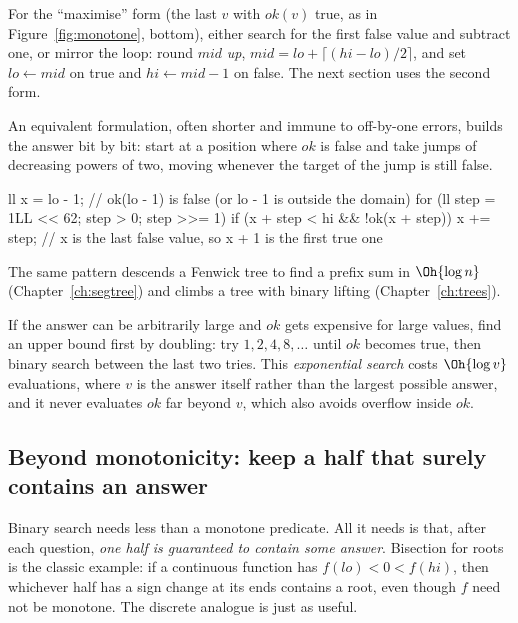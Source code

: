 For the ``maximise'' form (the last $v$ with $\mathit{ok}(v)$ true, as in Figure~\ref{fig:monotone}, bottom), either search
for the first false value and subtract one, or mirror the loop: round $mid$ \emph{up}, $mid = lo + \lceil (hi - lo)/2\rceil$,
and set $lo \gets mid$ on true and $hi \gets mid - 1$ on false. The next section uses the second form.


\begin{trick}
An equivalent formulation, often shorter and immune to off-by-one errors, builds the answer bit by bit: start at a position
where $\mathit{ok}$ is false and take jumps of decreasing powers of two, moving whenever the target of the jump is still
false.
\begin{code}
ll x = lo - 1;  // ok(lo - 1) is false (or lo - 1 is outside the domain)
for (ll step = 1LL << 62; step > 0; step >>= 1)
    if (x + step < hi && !ok(x + step)) x += step;
// x is the last false value, so x + 1 is the first true one
\end{code}
The same pattern descends a Fenwick tree to find a prefix sum in $\Oh{\log n}$ (Chapter~\ref{ch:segtree}) and climbs a tree
with binary lifting (Chapter~\ref{ch:trees}).
\end{trick}

\begin{trick}
If the answer can be arbitrarily large and $\mathit{ok}$ gets expensive for large values, find an upper bound first by
doubling: try $1, 2, 4, 8, \ldots$ until $\mathit{ok}$ becomes true, then binary search between the last two tries. This
\emph{exponential search} costs $\Oh{\log v}$ evaluations, where $v$ is the answer itself rather than the largest possible
answer, and it never evaluates $\mathit{ok}$ far beyond $v$, which also avoids overflow inside $\mathit{ok}$.
\end{trick}

\subsection{Beyond monotonicity: keep a half that surely contains an answer}

Binary search needs less than a monotone predicate. All it needs is that, after each question, \emph{one half is guaranteed
to contain some answer}. Bisection for roots is the classic example: if a continuous function has $f(lo) < 0 < f(hi)$, then
whichever half has a sign change at its ends contains a root, even though $f$ need not be monotone. The discrete analogue is
just as useful.


